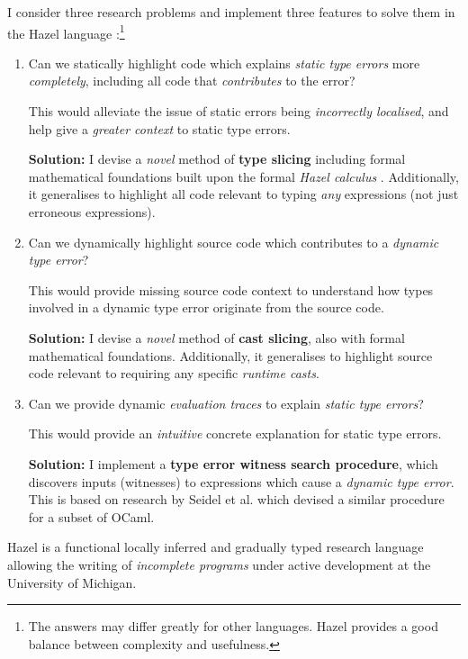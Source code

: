 I consider three research problems and implement three features to solve them in the Hazel language \cite{Hazel}:\footnote{The answers may differ greatly for other languages. Hazel provides a good balance between complexity and usefulness.}
\begin{enumerate}
\item Can we statically highlight code which explains \textit{static type errors} more \textit{completely}, including all code that \textit{contributes} to the error? 

This would alleviate the issue of static errors being \textit{incorrectly localised}, and help give a \textit{greater context} to static type errors.

\textbf{Solution:} I devise a \textit{novel} method of \textbf{type slicing} including formal mathematical foundations built upon the formal \textit{Hazel calculus} \cite{HazelLivePaper}. Additionally, it generalises to highlight all code relevant to typing \textit{any} expressions (not just erroneous expressions).

\item Can we dynamically highlight source code which contributes to a \textit{dynamic type error}?

This would provide missing source code context to understand how types involved in a dynamic type error originate from the source code.

\textbf{Solution:} I devise a \textit{novel} method of \textbf{cast slicing}, also with formal mathematical foundations. Additionally, it generalises to highlight source code relevant to requiring any specific \textit{runtime casts}.

\item Can we provide dynamic \textit{evaluation traces} to explain \textit{static type errors}?

This would provide an \textit{intuitive} concrete explanation for static type errors.

\textbf{Solution:} I implement a \textbf{type error witness search procedure}, which discovers inputs (witnesses) to expressions which cause a \textit{dynamic type error}. This is based on research by Seidel et al. \cite{SearchProc} which devised a similar procedure for a subset of OCaml.
\end{enumerate}

Hazel \cite{Hazel} is a functional locally inferred and gradually typed research language allowing the writing of \textit{incomplete programs} under active development at the University of Michigan. 

